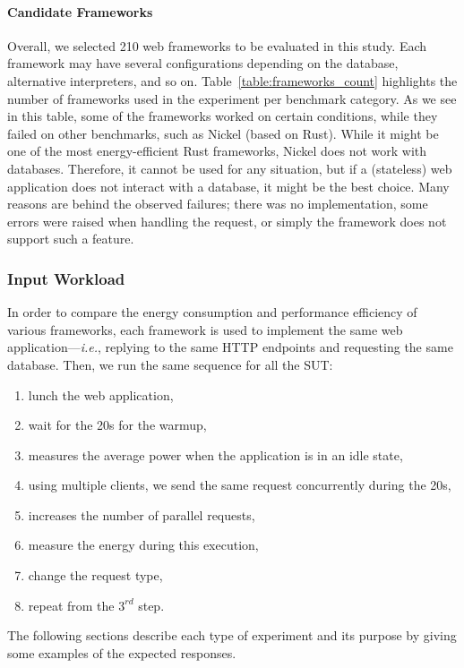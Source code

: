 \paragraph{Candidate Frameworks}

Overall, we selected 210 web frameworks to be evaluated in this study.
Each framework may have several configurations depending on the database, alternative interpreters, and so on.
Table~\ref{table:frameworks_count} highlights the number of frameworks used in the experiment per benchmark category.
As we see in this table, some of the frameworks worked on certain conditions, while they failed on other benchmarks, such as Nickel (based on Rust).
While it might be one of the most energy-efficient Rust frameworks, Nickel does not work with databases.
Therefore, it cannot be used for any situation, but if a (stateless) web application does not interact with a database, it might be the best choice.
Many reasons are behind the observed failures; there was no implementation, some errors were raised when handling the request, or simply the framework does not support such a feature.

\subsubsection{Input Workload}

In order to compare the energy consumption and performance efficiency of various frameworks, each framework is used to implement the same web application---\emph{i.e.}, replying to the same HTTP endpoints and requesting the same database. Then, we run the same sequence for all the SUT:
\begin{enumerate}
    \item lunch the web application,
    \item wait for the 20s for the warmup,
    \item measures the average power when the application is in an idle state,
    \item using multiple clients, we send the same request concurrently during the 20s,
    \item increases the number of parallel requests,
    \item measure the energy during this execution,
    \item change the request type,
    \item repeat from the $3^{rd}$ step.
\end{enumerate}

The following sections describe each type of experiment and its purpose by giving some examples of the expected responses.

